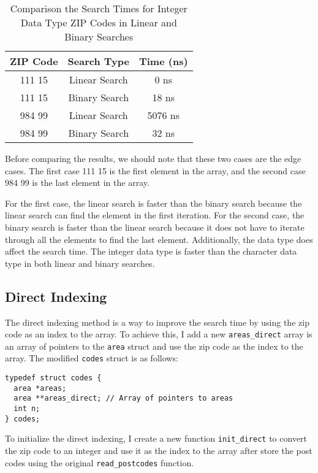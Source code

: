 \documentclass[a4paper,11pt]{article}
\begin{document}
\begin{table}[h!]
  \centering
  \begin{tabular}{|c|c|c|}
    \hline
    \textbf{ZIP Code} & \textbf{Search Type} & \textbf{Time (ns)} \\ \hline
    111 15 & Linear Search & 0 ns \\ \hline
    111 15 & Binary Search & 18 ns \\ \hline
    984 99 & Linear Search & 5076 ns \\ \hline
    984 99 & Binary Search & 32 ns \\ \hline
  \end{tabular}
  \caption{Comparison the Search Times for Integer Data Type ZIP Codes in Linear and Binary Searches}
  \label{table:binary_times}
\end{table}

Before comparing the results, we should note that these two cases are the edge cases. 
The first case 111 15 is the first element in the array, and the second case 984 99 is the last element in the array.

For the first case, the linear search is faster than the binary search because the linear search can find the element in the first iteration.
For the second case, the binary search is faster than the linear search because it does not have to iterate through all the elements to find the last element.
Additionally, the data type does affect the search time. The integer data type is faster than the character data type in both linear and binary searches.

\subsection*{Direct Indexing}

The direct indexing method is a way to improve the search time by using the zip code as an index to the array.
To achieve this, I add a new {\tt areas\_direct} array is an array of pointers to the {\tt area} struct
and use the zip code as the index to the array.
The modified {\tt codes} struct is as follows:

\begin{verbatim}
typedef struct codes {
  area *areas;
  area **areas_direct; // Array of pointers to areas
  int n;
} codes;
\end{verbatim}

To initialize the direct indexing, I create a new function {\tt init\_direct}
to convert the zip code to an integer and use it as the index to the array after store the post codes
using the original {\tt read\_postcodes} function.
\end{document}
